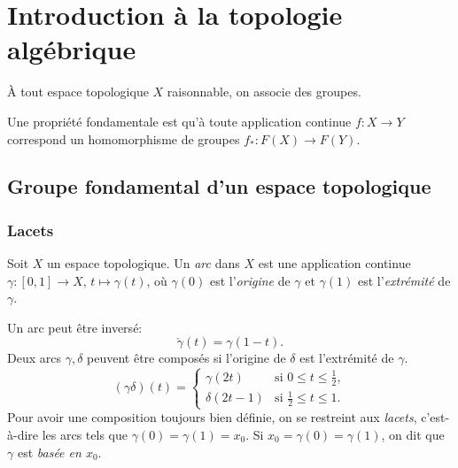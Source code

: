 
\chapter{Introduction à la topologie algébrique}

  À tout espace topologique $X$ raisonnable, on associe des groupes.

  Une propriété fondamentale est qu'à toute application continue $f: X \to Y$ correspond un homomorphisme de
  groupes $f_\ast:F(X) \to F(Y)$.

  \section{Groupe fondamental d'un espace topologique}
  \label{sec:grp-fondamental-esp-topo}

    \subsection{Lacets}

    \begin{defi}
      Soit $X$ un espace topologique. Un \emph{arc} dans $X$ est une application continue $\gamma: [0,1] \to
      X,\, t \mapsto \gamma(t)$, où $\gamma(0)$ est l'\emph{origine} de $\gamma$ et $\gamma(1)$ est
      l'\emph{extrémité} de $\gamma$.
    \end{defi}

    
    Un arc peut être inversé:
      \[\check{\gamma}(t) = \gamma(1-t).\]
    Deux arcs $\gamma, \delta$ peuvent être composés si l'origine de $\delta$ est l'extrémité de $\gamma$. 
      \[(\gamma\delta)(t) =
      \begin{cases}
        \gamma(2t) & \text{si } 0 \leq t \leq \frac{1}{2},\\
        \delta(2t-1) & \text{si } \frac{1}{2} \leq t \leq 1.
      \end{cases}
      \]
    Pour avoir une composition toujours bien définie, on se restreint aux \emph{lacets}, c'est-à-dire les arcs
    tels que $\gamma(0) = \gamma(1) = x_0$. Si $x_0 = \gamma(0) = \gamma(1)$, on dit que $\gamma$ est
    \emph{basée en $x_0$}.

